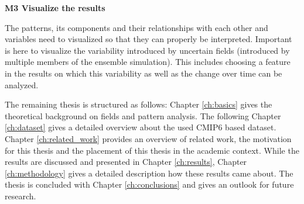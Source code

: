 \textbf{M3 Visualize the results}

The patterns, its components and their relationships with each other and variables need to visualized so that they can properly be interpreted. 
Important is here  to visualize the variability introduced by uncertain fields (introduced by multiple members of the ensemble simulation).  
This includes choosing a feature in the results on which this variability as well as the change over time can be analyzed. 


\vspace{.3cm}
The remaining thesis is structured as follows: Chapter \ref{ch:basics} gives the theoretical background on fields and pattern analysis. 
The following Chapter \ref{ch:dataset} gives a detailed overview about the used CMIP6 based dataset. 
Chapter \ref{ch:related_work} provides an overview of related work, the motivation for this thesis and the placement of this thesis in the academic context. 
While the results are discussed and presented in Chapter \ref{ch:results}, Chapter \ref{ch:methodology} gives a detailed description how these results came about. 
The thesis is concluded with Chapter \ref{ch:conclusions} and gives an outlook for future research. 

